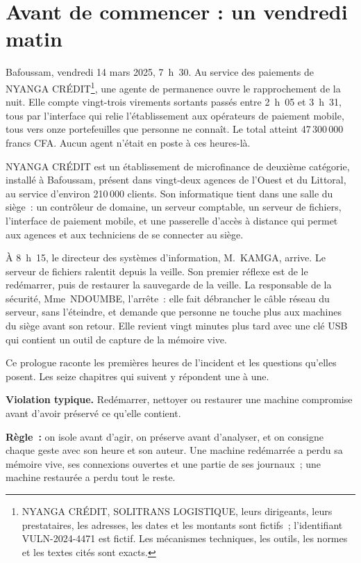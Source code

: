 \section*{Avant de commencer : un vendredi matin}

Bafoussam, vendredi 14 mars 2025, 7~h~30. Au service des paiements de NYANGA
CRÉDIT\footnote{NYANGA CRÉDIT, SOLITRANS LOGISTIQUE, leurs dirigeants, leurs
prestataires, les adresses, les dates et les montants sont fictifs~;
l'identifiant VULN-2024-4471 est fictif. Les mécanismes techniques, les
outils, les normes et les textes cités sont exacts.}, une agente de
permanence ouvre le rapprochement de la nuit. Elle compte vingt-trois
virements sortants passés entre 2~h~05 et 3~h~31, tous par l'interface qui
relie l'établissement aux opérateurs de paiement mobile, tous vers onze
portefeuilles que personne ne connaît. Le total atteint 47\,300\,000 francs
CFA. Aucun agent n'était en poste à ces heures-là.

NYANGA CRÉDIT est un établissement de microfinance de deuxième catégorie,
installé à Bafoussam, présent dans vingt-deux agences de l'Ouest et du
Littoral, au service d'environ 210\,000 clients. Son informatique tient dans
une salle du siège~: un contrôleur de domaine, un serveur comptable, un
serveur de fichiers, l'interface de paiement mobile, et une passerelle
d'accès à distance qui permet aux agences et aux techniciens de se connecter
au siège.

À 8~h~15, le directeur des systèmes d'information, M.~KAMGA, arrive. Le
serveur de fichiers ralentit depuis la veille. Son premier réflexe est de le
redémarrer, puis de restaurer la sauvegarde de la veille. La responsable de la
sécurité, Mme~NDOUMBE, l'arrête~: elle fait débrancher le câble réseau du
serveur, sans l'éteindre, et demande que personne ne touche plus aux
machines du siège avant son retour. Elle revient vingt minutes plus tard avec
une clé USB qui contient un outil de capture de la mémoire vive.

\medskip

Ce prologue raconte les premières heures de l'incident et les questions
qu'elles posent. Les seize chapitres qui suivent y répondent une à une.

\begin{boxalert}
\textbf{Violation typique.} Redémarrer, nettoyer ou restaurer une machine
compromise avant d'avoir préservé ce qu'elle contient.

\smallskip
\textbf{Règle~:} on isole avant d'agir, on préserve avant d'analyser, et on
consigne chaque geste avec son heure et son auteur. Une machine redémarrée a
perdu sa mémoire vive, ses connexions ouvertes et une partie de ses
journaux~; une machine restaurée a perdu tout le reste.
\end{boxalert}

